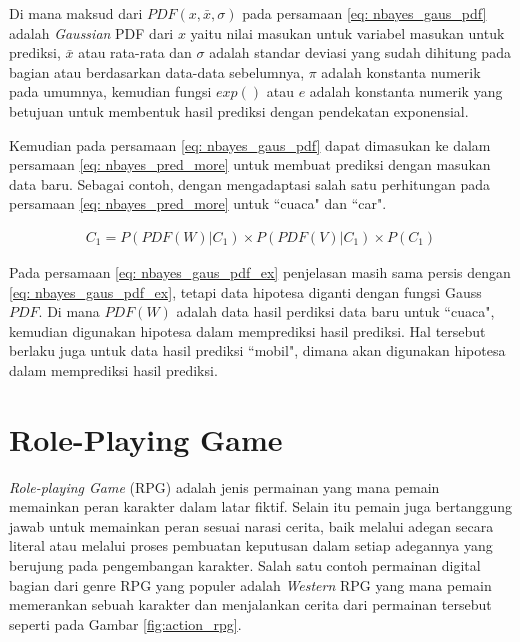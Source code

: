 \begin{subs}
\begin{enumerate}[label=\textbf{\arabic*).}]
		Di mana maksud dari $PDF(x, \bar{x}, \sigma)$ pada persamaan \ref{eq: nbayes_gaus_pdf} adalah \textit{Gaussian} PDF dari $x$ yaitu nilai masukan untuk variabel masukan untuk prediksi, $\bar x$ atau rata-rata dan $\sigma$ adalah standar deviasi yang sudah dihitung pada bagian atau berdasarkan data-data sebelumnya, $\pi$ adalah konstanta numerik pada umumnya, kemudian fungsi $exp()$ atau $e$ adalah konstanta numerik yang betujuan untuk membentuk hasil prediksi dengan pendekatan exponensial.
		\vspace{1ex}
		
		Kemudian pada persamaan \ref{eq: nbayes_gaus_pdf} dapat dimasukan ke dalam persamaan \ref{eq: nbayes_pred_more} untuk membuat prediksi dengan masukan data baru. Sebagai contoh, dengan mengadaptasi salah satu perhitungan pada persamaan \ref{eq: nbayes_pred_more} untuk ``cuaca" dan ``car".
		
		\begin{equation}\label{eq: nbayes_gaus_pdf_ex}
		\begin{split}
		C_{1} = P(PDF(W)|C_{1}) \times P(PDF(V)|C_{1}) \times P(C_{1})
		\end{split}
		\end{equation}
		
		Pada persamaan \ref{eq: nbayes_gaus_pdf_ex} penjelasan masih sama persis dengan \ref{eq: nbayes_gaus_pdf_ex}, tetapi data hipotesa diganti dengan fungsi Gauss $PDF$. Di mana $PDF(W)$ adalah data hasil perdiksi data baru untuk ``cuaca", kemudian digunakan hipotesa dalam memprediksi hasil prediksi. Hal tersebut berlaku juga untuk data hasil prediksi ``mobil", dimana akan digunakan hipotesa dalam memprediksi hasil prediksi.
	\end{enumerate}
\end{subs}

\section{Role-Playing Game}
\label{sec:sec2_turn_based_rpg}
\vspace{1ex}

\textit{Role-playing Game} (RPG) \citep{Panumate2015} adalah jenis permainan yang mana pemain memainkan peran karakter dalam latar fiktif. Selain itu pemain juga bertanggung jawab untuk memainkan peran sesuai narasi cerita, baik melalui adegan secara literal atau melalui proses pembuatan keputusan dalam setiap adegannya yang berujung pada pengembangan karakter. Salah satu contoh permainan digital bagian dari genre RPG yang populer adalah \textit{Western} RPG yang mana pemain memerankan sebuah karakter dan menjalankan cerita dari permainan tersebut seperti pada Gambar \ref{fig:action_rpg}.
\vspace{2ex}

